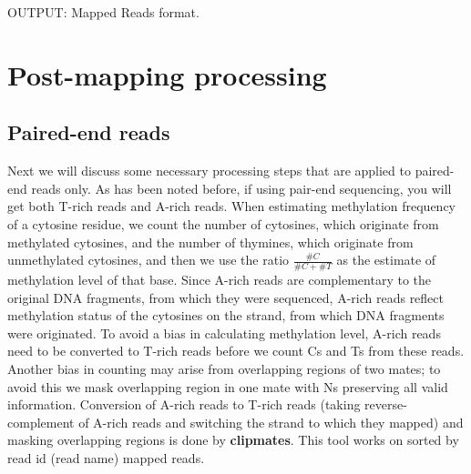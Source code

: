 \documentclass{article}
\begin{document}
OUTPUT: Mapped Reads format.
 
\section{Post-mapping processing}
\label{sec:postmapping}

\subsection{Paired-end reads}
\label{sec:pairedend_reads}

Next we will discuss some necessary processing steps that are applied to
paired-end reads only.
As has been noted before, if using pair-end sequencing, you will get
both T-rich reads and A-rich reads. When estimating methylation
frequency of a cytosine residue, we count the number of cytosines,
which originate from methylated cytosines, and the number of thymines,
which originate from unmethylated cytosines, and then we use the ratio
$\frac{\#C}{\#C+\#T}$ as the estimate of methylation level of that
base. Since A-rich reads are complementary to the original DNA fragments, 
from which they were sequenced, A-rich reads reflect methylation status
of the cytosines on the strand, from which DNA fragments were originated.
To avoid a bias in calculating methylation level, A-rich reads need to be 
converted to T-rich reads
before we count Cs and Ts from these reads. 
Another bias in counting may arise from overlapping regions of two mates; to avoid
this we mask overlapping region in one mate with Ns preserving all valid information.
Conversion of A-rich reads to T-rich reads (taking reverse-complement of A-rich 
reads and switching the strand to which they mapped) and masking overlapping regions
is done by \textbf{clipmates}. This tool works on sorted by read id (read name) mapped
reads. 
\end{document}
